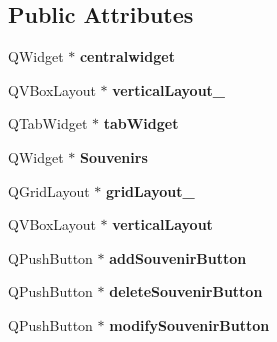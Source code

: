 \subsection*{Public Attributes}
\begin{DoxyCompactItemize}
\item 
\mbox{\label{class_ui__admin_window_ad17f51669733a04a3298e884a350194b}} 
Q\+Widget $\ast$ {\bfseries centralwidget}
\item 
\mbox{\label{class_ui__admin_window_a3efeff4dd5b4d8006af9561f2445dd6b}} 
Q\+V\+Box\+Layout $\ast$ {\bfseries vertical\+Layout\+\_}
\item 
\mbox{\label{class_ui__admin_window_ab111ad2ea5a7eaaed4b3a210fa2f04a7}} 
Q\+Tab\+Widget $\ast$ {\bfseries tab\+Widget}
\item 
\mbox{\label{class_ui__admin_window_a5f95ae553e3536ea20fc676fea548ab9}} 
Q\+Widget $\ast$ {\bfseries Souvenirs}
\item 
\mbox{\label{class_ui__admin_window_a4177cf23c76973765b5de9df513f98c0}} 
Q\+Grid\+Layout $\ast$ {\bfseries grid\+Layout\+\_}
\item 
\mbox{\label{class_ui__admin_window_a26e5e13441590f51dfe567a87624c4a7}} 
Q\+V\+Box\+Layout $\ast$ {\bfseries vertical\+Layout}
\item 
\mbox{\label{class_ui__admin_window_a924f2b6743841ae5694fd3bf44bf91ac}} 
Q\+Push\+Button $\ast$ {\bfseries add\+Souvenir\+Button}
\item 
\mbox{\label{class_ui__admin_window_ab0bd29b925697ec6823f0c718a96cd06}} 
Q\+Push\+Button $\ast$ {\bfseries delete\+Souvenir\+Button}
\item 
\mbox{\label{class_ui__admin_window_afa645122c8ce804d9ad043dea4ae4cee}} 
Q\+Push\+Button $\ast$ {\bfseries modify\+Souvenir\+Button}
\item 
\mbox{\label{class_ui__admin_window_a8bf7c4653f28f8e02195c300b9f02b91}} 

\end{DoxyCompactItemize}
